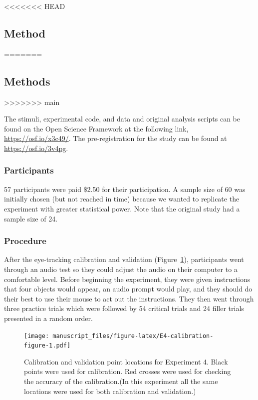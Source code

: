 \documentclass[
  man,floatsintext]{apa6}
\begin{document}
<<<<<<< HEAD
\subsection{Method}\label{method-3}
=======
\subsection{Methods}\label{methods-3}
>>>>>>> main

The stimuli, experimental code, and data and original analysis scripts can be
found on the Open Science Framework at the following link,
\url{https://osf.io/x3c49/}. The pre-registration
for the study can be found at \url{https://osf.io/3v4pg}.

\subsubsection{Participants}\label{participants-4}

57 participants were paid \$2.50 for their participation. A sample size of 60 was initially chosen (but not reached in time) because we wanted to replicate the experiment with greater statistical power. Note that the original study had a sample size of 24.

\subsubsection{Procedure}\label{procedure-3}

After the eye-tracking calibration and validation (Figure~\ref{fig:E4-calibration-figure}), participants went through an audio
test so they could adjust the audio on their computer to a comfortable
level. Before beginning the experiment, they were given instructions
that four objects would appear, an audio prompt would play, and they
should do their best to use their mouse to act out the instructions.
They then went through three practice trials which were followed by 54
critical trials and 24 filler trials presented in a random order.

\begin{figure}
\centering
\texttt{[image: manuscript\_files/figure-latex/E4-calibration-figure-1.pdf]}
\caption{\label{fig:E4-calibration-figure}Calibration and validation point locations for Experiment 4. Black points were used for calibration. Red crosses were used for checking the accuracy of the calibration.(In this experiment all the same locations were used for both calibration and validation.)}
\end{figure}
\end{document}
